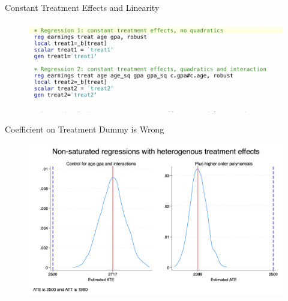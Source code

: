 \documentclass{beamer}
\begin{document}
\begin{frame}{Constant Treatment Effects and Linearity}

\begin{figure}[!t]\centering
\includegraphics[scale=0.45]{./lecture_includes/stata_reg_constant}
\end{figure}

\end{frame}


\begin{frame}{Coefficient on Treatment Dummy is Wrong}

\begin{figure}[!t]\centering
\includegraphics[scale=0.1]{./lecture_includes/combined_kernels.jpg}
\end{figure}

\end{frame}
\end{document}
